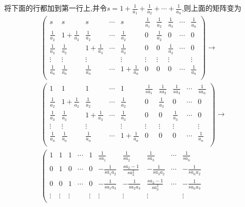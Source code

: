 \documentclass[../../main.tex]{subfiles}%
\begin{document}
\begin{solution}
将下面的行都加到第一行上,并令\(s = 1 + \frac{1}{a_1} + \frac{1}{a_2} + \cdots + \frac{1}{a_n}\),则上面的矩阵变为
\begin{gather*}
\left( \begin{matrix}
s&		s&		s&		\cdots&		s&		\frac{1}{a_1}&		\frac{1}{a_2}&		\frac{1}{a_3}&		\cdots&		\frac{1}{a_n}\\
\frac{1}{a_2}&		1+\frac{1}{a_2}&		\frac{1}{a_2}&		\cdots&		\frac{1}{a_2}&		0&		\frac{1}{a_2}&		0&		\cdots&		0\\
\frac{1}{a_3}&		\frac{1}{a_3}&		1+\frac{1}{a_3}&		\cdots&		\frac{1}{a_3}&		0&		0&		\frac{1}{a_3}&		\cdots&		0\\
\vdots&		\vdots&		\vdots&		&		\vdots&		\vdots&		\vdots&		\vdots&		&		\vdots\\
\frac{1}{a_n}&		\frac{1}{a_n}&		\frac{1}{a_n}&		\cdots&		1+\frac{1}{a_n}&		0&		0&		0&		\cdots&		\frac{1}{a_n}\\
\end{matrix} \right) \rightarrow 
\\
\left( \begin{matrix}
1&		1&		1&		\cdots&		1&		\frac{1}{sa_1}&		\frac{1}{sa_2}&		\frac{1}{sa_3}&		\cdots&		\frac{1}{sa_n}\\
\frac{1}{a_2}&		1+\frac{1}{a_2}&		\frac{1}{a_2}&		\cdots&		\frac{1}{a_2}&		0&		\frac{1}{a_2}&		0&		\cdots&		0\\
\frac{1}{a_3}&		\frac{1}{a_3}&		1+\frac{1}{a_3}&		\cdots&		\frac{1}{a_3}&		0&		0&		\frac{1}{a_3}&		\cdots&		0\\
\vdots&		\vdots&		\vdots&		&		\vdots&		\vdots&		\vdots&		\vdots&		&		\vdots\\
\frac{1}{a_n}&		\frac{1}{a_n}&		\frac{1}{a_n}&		\cdots&		1+\frac{1}{a_n}&		0&		0&		0&		\cdots&		\frac{1}{a_n}\\
\end{matrix} \right) \rightarrow 
\\
\left( \begin{matrix}
1&		1&		1&		\cdots&		1&		\frac{1}{sa_1}&		\frac{1}{sa_2}&		\frac{1}{sa_3}&		\cdots&		\frac{1}{sa_n}\\
0&		1&		0&		\cdots&		0&		-\frac{1}{sa_1a_2}&		\frac{sa_2-1}{sa_{2}^{2}}&		-\frac{1}{sa_3a_2}&		\cdots&		-\frac{1}{sa_na_2}\\
0&		0&		1&		\cdots&		0&		-\frac{1}{sa_1a_3}&		-\frac{1}{sa_2a_3}&		\frac{sa_3-1}{sa_{3}^{2}}&		\cdots&		-\frac{1}{sa_na_3}\\
\vdots&		\vdots&		\vdots&		&		\vdots&		\vdots&		\vdots&		\vdots&		&		\vdots\\

\end{matrix}
\end{gather*}
\end{solution}
\end{document}
